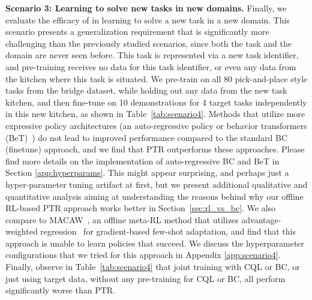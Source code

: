 \textbf{Scenario 3: Learning to solve new tasks in new domains.} 
Finally, we evaluate the efficacy of \ptrmethodname in learning to solve a new task in a new domain. 
This scenario presents a generalization requirement that is significantly more challenging than the previously studied scenarios, since both the task and the domain are never seen before. This task is represented via a new task identifier, and pre-training receives no data for this task identifier, or even any data from the kitchen where this task is situated. We pre-train on all 80 pick-and-place style tasks from the bridge dataset, while holding out any data from the new task kitchen, and then fine-tune on 10 demonstrations for 4 target tasks independently in this new kitchen, as shown in Table~\ref{tab:scenario4}. 
Methods that utilize more expressive policy architectures (an auto-regressive policy or behavior transformers (BeT)~\citep{shafiullah2022behavior}) do not lead to improved performance compared to the standard BC (finetune) approach, and we find that PTR outperforms these approaches. Please find more details on the implementation of auto-regressive BC and BeT in Section \ref{app:hyperparams}. This might appear surprising, and perhaps just a hyper-parameter tuning artifact at first, but we present additional qualitative and quantitative analysis aiming at understanding the reasons behind why our offline RL-based PTR approach works better in Section~\ref{sec:rl_vs_bc}. We also compare to MACAW~\citep{mitchell2021offline}, an offline meta-RL method that utilizes advantage-weighted regression~\citep{peng2019awr} for gradient-based few-shot adaptation, and find that this approach is unable to learn policies that succeed. We discuss the hyperparameter configurations that we tried for this approach in Appendix \ref{app:scenario4}. Finally, observe in Table~\ref{tab:scenario4} that joint training with CQL or BC, or just using target data, without any pre-training for CQL or BC, all perform significantly worse than PTR.

